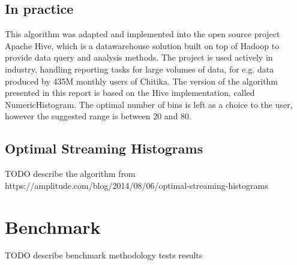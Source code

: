 \documentclass[12pt]{article}
\begin{document}
	\subsection{In practice}
	This algorithm was adapted and implemented into the open source project Apache 
	Hive\cite{Thusoo:2009:HWS:1687553.1687609}, which is a datawarehouse solution 
	built on top of Hadoop to provide data query and analysis methods. The project 
	is used actively in industry, handling reporting tasks for large volumes of data,
	for e.g. data produced by 435M monthly users of Chitika\cite{HivePoweredBy}.
	The version of the algorithm presented in this report is based on the Hive 
	implementation, called NumericHistogram\cite{HiveImplementation}. The optimal 
	number of bins is left as a choice to the user, however the suggested range 
	is between 20 and 80.


	\subsection{Optimal Streaming Histograms}
	TODO describe the algorithm from 
	https://amplitude.com/blog/2014/08/06/optimal-streaming-histograms

	\section{Benchmark}
	TODO describe benchmark methodology
	tests
	results

	\newpage
	
	
\end{document}
